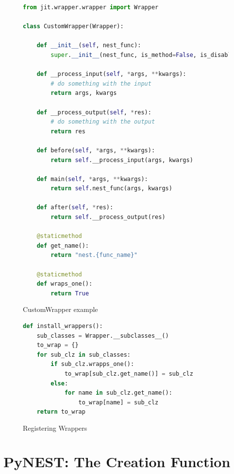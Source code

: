 \begin{figure}[ht!]
\centering
 \begin{lstlisting}[language=Python, label=lst:custom_wrapper]
from jit.wrapper.wrapper import Wrapper

class CustomWrapper(Wrapper):

    def __init__(self, nest_func):
        super.__init__(nest_func, is_method=False, is_disabled=False)
        
    def __process_input(self, *args, **kwargs):
        # do something with the input
        return args, kwargs

    def __process_output(self, *res):
        # do something with the output
        return res
        
    def before(self, *args, **kwargs):
        return self.__process_input(args, kwargs)
    
    def main(self, *args, **kwargs):
        return self.nest_func(args, kwargs)
        
    def after(self, *res):
        return self.__process_output(res)
        
    @staticmethod
    def get_name():
        return "nest.{func_name}"
    
    @staticmethod
    def wraps_one():
        return True

\end{lstlisting}
    \caption{CustomWrapper example}
\end{figure}




\begin{figure}[ht!]
    \centering
    \begin{lstlisting}[language=Python, label=lst:wrapper_reg]
def install_wrappers():
    sub_classes = Wrapper.__subclasses__()
    to_wrap = {}
    for sub_clz in sub_classes:
        if sub_clz.wrapps_one():
            to_wrap[sub_clz.get_name()] = sub_clz
        else:
            for name in sub_clz.get_name():
                to_wrap[name] = sub_clz
    return to_wrap
\end{lstlisting}
    \caption{Registering Wrappers}
\end{figure}





\section{PyNEST: The Creation Function}

